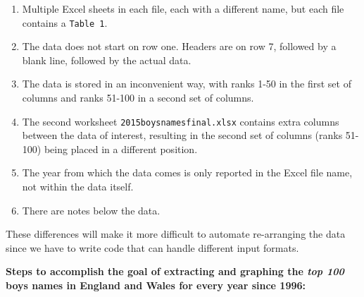 \documentclass[
]{book}
\providecommand{\tightlist}{%
  \setlength{\itemsep}{0pt}\setlength{\parskip}{0pt}}
\begin{document}
\begin{enumerate}
\def\labelenumi{\arabic{enumi}.}
\tightlist
\item
  Multiple Excel sheets in each file, each with a different name, but each file contains a \texttt{Table\ 1}.
\item
  The data does not start on row one. Headers are on row 7, followed by a blank line, followed by the actual data.
\item
  The data is stored in an inconvenient way, with ranks 1-50 in the first set of columns and ranks 51-100 in a second set of columns.
\item
  The second worksheet \texttt{2015boysnamesfinal.xlsx} contains extra columns between the data of interest, resulting in the second set of columns (ranks 51-100) being placed in a different position.
\item
  The year from which the data comes is only reported in the Excel file name, not within the data itself.
\item
  There are notes below the data.
\end{enumerate}

These differences will make it more difficult to automate re-arranging the data since we have to write code that can handle different input formats.

\textbf{Steps to accomplish the goal of extracting and graphing the \emph{top 100} boys names in England and Wales for every year since 1996:}
\end{document}
